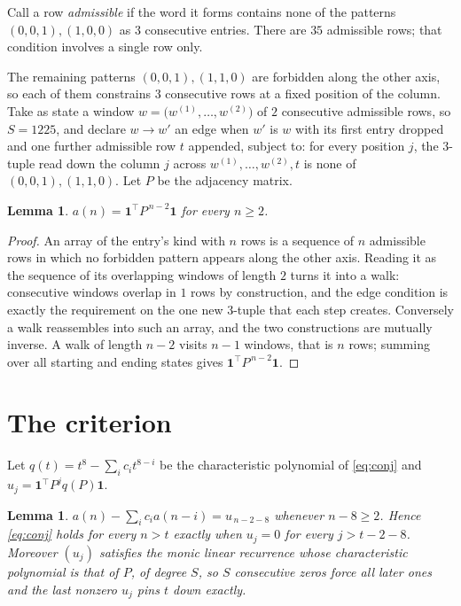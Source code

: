 \documentclass[11pt,a4paper]{article}
\theoremstyle{plain}
\newtheorem{lemma}[theorem]{Lemma}
\theoremstyle{definition}
\begin{document}
Call a row \emph{admissible} if the word it forms contains none of the patterns
$(0,0,1), (1,0,0)$ as $3$ consecutive entries. There are $35$ admissible rows; that condition
involves a single row only.

The remaining patterns $(0,0,1), (1,1,0)$ are forbidden along the other axis, so each of them
constrains $3$ consecutive rows at a fixed position of the column. Take as state a
window $w=\bigl(w^{(1)},\dots,w^{(2)}\bigr)$ of $2$ consecutive admissible
rows, so $S=1225$, and declare $w\to w'$ an edge when $w'$ is $w$ with its first entry
dropped and one further admissible row $t$ appended, subject to: for every position
$j$, the $3$-tuple read down the column $j$ across $w^{(1)},\dots,w^{(2)},t$
is none of $(0,0,1), (1,1,0)$. Let $P$ be the adjacency matrix.

\begin{lemma}\label{lem:walk}
$a(n)=\mathbf{1}^{\!\top}P^{\,n-2}\mathbf{1}$ for every $n\ge2$.
\end{lemma}

\begin{proof}
An array of the entry's kind with $n$ rows is a sequence of $n$ admissible rows in
which no forbidden pattern appears along the other axis. Reading it as the sequence of its
overlapping windows of length $2$ turns it into a walk: consecutive windows overlap in
$1$ rows by construction, and the edge condition is exactly the requirement on the one
new $3$-tuple that each step creates. Conversely a walk reassembles into such an array,
and the two constructions are mutually inverse. A walk of length $n-2$ visits $n-1$
windows, that is $n$ rows; summing over all starting and ending states gives
$\mathbf{1}^{\!\top}P^{\,n-2}\mathbf{1}$.
\end{proof}

\section{The criterion}

Let $q(t)=t^{8}-\sum_i c_i t^{8-i}$ be the characteristic polynomial of
\eqref{eq:conj} and $u_j=\mathbf{1}^{\!\top}P^{j}q(P)\mathbf{1}$.

\begin{lemma}\label{lem:crit}
$a(n)-\sum_i c_i a(n-i)=u_{\,n-2-8}$ whenever $n-8\ge2$. Hence
\eqref{eq:conj} holds for every $n>t$ exactly when $u_j=0$ for every
$j>t-2-8$. Moreover $(u_j)$ satisfies the monic linear recurrence whose
characteristic polynomial is that of $P$, of degree $S$, so $S$ consecutive zeros force all
later ones and the last nonzero $u_j$ pins $t$ down exactly.
\end{lemma}
\end{document}
